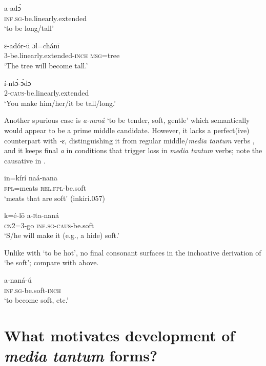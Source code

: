 \documentclass[output=paper,colorlinks,citecolor=brown
]{langscibook}
\begin{document}
\ea \label{ex:Payne:be.long}
\begin{xlist}
\ex 
\gll a-adɔ́\\
\textsc{inf.sg}-be.linearly.extended\\
\glt `to be long/tall'

\ex
\gll ɛ-adór-ū ɔl=chánī\\
3-be.linearly.extended-\textsc{inch} \textsc{msg}=tree\\
\glt `The tree will become tall.'

\ex 
\gll í-ntɔ́-ɔ́dɔ 	\\
2-\textsc{caus}-be.linearly.extended\\		
\glt ‘You make him/her/it be tall/long.’
\end{xlist}
\z 

Another spurious case is \textit{a-naná} `to be tender, soft, gentle' which semantically would appear to be a prime middle candidate. However, it lacks a perfect(ive) counterpart with \textit{-ɛ}, distinguishing it from regular middle/\textit{media tantum} verbs \citep{Mol1996}, and it keeps final \textit{a} in conditions that trigger loss in \textit{media tantum} verbs; note the causative in .

\ea \label{ex:Payne:cause-be.soft1}
\gll in=kírí	naá-nana	\\
\textsc{fpl}=meats	\textsc{rel.fpl}-be.soft 	\\
\glt `meats that are soft’ (inkiri.057)
\z 

\ea \label{ex:Payne:cause-be.soft}
\gll k=é-lō a-ɪta-naná \\
\textsc{cn2}=3-go \textsc{inf.sg}-\textsc{caus}-be.soft \\
\glt `S/he will make it (e.g., a hide) soft.'
\z

Unlike with `to be hot', no final consonant surfaces in the inchoative derivation of `be soft'; compare  with  above.

\ea \label{ex:Payne:become-soft}
\gll a-naná-ú \\
\textsc{inf.sg}-be.soft-\textsc{inch}\\
\glt `to become soft, etc.’
\z 

\section{What motivates development of \textit{media tantum} forms?}\label{sec:Payne:Motivation}
\end{document}
